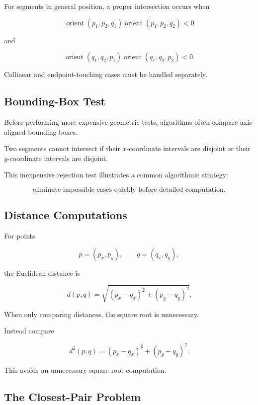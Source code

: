 For segments in general position, a proper intersection occurs when

\[
\boxed{
\operatorname{orient}(p_1,p_2,q_1)
\operatorname{orient}(p_1,p_2,q_2)<0
}
\]

and

\[
\boxed{
\operatorname{orient}(q_1,q_2,p_1)
\operatorname{orient}(q_1,q_2,p_2)<0.
}
\]

Collinear and endpoint-touching cases must be handled separately.

\subsection{Bounding-Box Test}
\label{subsec:bounding-box-test}

Before performing more expensive geometric tests, algorithms often compare
axis-aligned bounding boxes.

Two segments cannot intersect if their \(x\)-coordinate intervals are
disjoint or their \(y\)-coordinate intervals are disjoint.

This inexpensive rejection test illustrates a common algorithmic strategy:

\[
\boxed{
\text{eliminate impossible cases quickly before detailed computation}.
}
\]

\subsection{Distance Computations}
\label{subsec:computational-distance}

For points

\[
p=(p_x,p_y),
\qquad
q=(q_x,q_y),
\]

the Euclidean distance is

\[
\boxed{
d(p,q)
=
\sqrt{
(p_x-q_x)^2+(p_y-q_y)^2
}.
}
\]

When only comparing distances, the square root is unnecessary.

Instead compare

\[
\boxed{
d^2(p,q)
=
(p_x-q_x)^2+(p_y-q_y)^2.
}
\]

This avoids an unnecessary square-root computation.

\subsection{The Closest-Pair Problem}
\label{subsec:closest-pair-problem}

